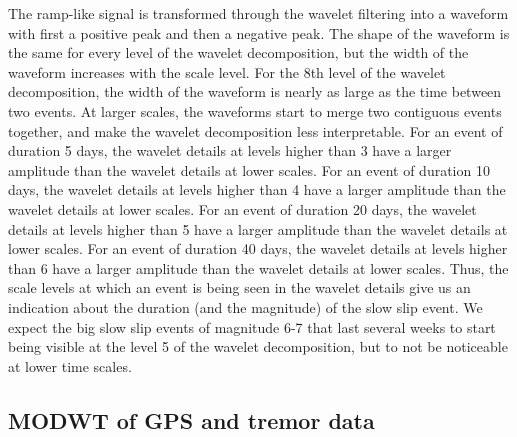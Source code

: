\documentclass[draft]{agujournal2018}
\begin{document}
The ramp-like signal is transformed through the wavelet filtering into a waveform with first a positive peak and then a negative peak. The shape of the waveform is the same for every level of the wavelet decomposition, but the width of the waveform increases with the scale level. For the 8th level of the wavelet decomposition, the width of the waveform is nearly as large as the time between two events. At larger scales, the waveforms start to merge two contiguous events together, and make the wavelet decomposition less interpretable. For an event of duration 5 days, the wavelet details at levels higher than 3 have a larger amplitude than the wavelet details at lower scales. For an event of duration 10 days, the wavelet details at levels higher than 4 have a larger amplitude than the wavelet details at lower scales. For an event of duration 20 days, the wavelet details at levels higher than 5 have a larger amplitude than the wavelet details at lower scales. For an event of duration 40 days, the wavelet details at levels higher than 6 have a larger amplitude than the wavelet details at lower scales. Thus, the scale levels at which an event is being seen in the wavelet details give us an indication about the duration (and the magnitude) of the slow slip event. We expect the big slow slip events of magnitude 6-7 that last several weeks to start being visible at the level 5 of the wavelet decomposition, but to not be noticeable at lower time scales. \\

\subsection{MODWT of GPS and tremor data}
\end{document}
